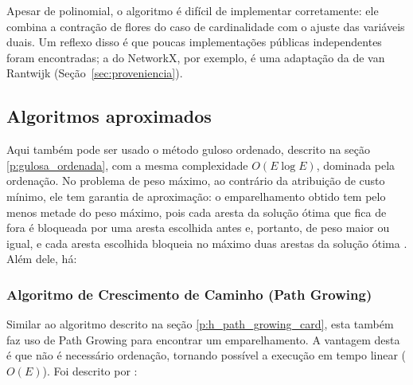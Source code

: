 Apesar de polinomial, o algoritmo é difícil de implementar corretamente: ele combina a contração de flores do caso de cardinalidade com o ajuste das variáveis duais. Um reflexo disso é que poucas implementações públicas independentes foram encontradas; a do NetworkX, por exemplo, é uma adaptação da de van Rantwijk (Seção~\ref{sec:proveniencia}).



\subsection{Algoritmos aproximados}
\label{sec:emp_pond_max_aprox}

Aqui também pode ser usado o método guloso ordenado, descrito na seção \ref{p:gulosa_ordenada}, com a mesma complexidade $O(E \log E)$, dominada pela ordenação. No problema de peso máximo, ao contrário da atribuição de custo mínimo, ele tem garantia de aproximação: o emparelhamento obtido tem pelo menos metade do peso máximo, pois cada aresta da solução ótima que fica de fora é bloqueada por uma aresta escolhida antes e, portanto, de peso maior ou igual, e cada aresta escolhida bloqueia no máximo duas arestas da solução ótima \cite{drake}. Além dele, há:

\subsubsection{Algoritmo de Crescimento de Caminho (Path Growing)}

Similar ao algoritmo descrito na seção \ref{p:h_path_growing_card}, esta também faz uso de Path Growing para encontrar um emparelhamento. A vantagem desta é que não é necessário ordenação, tornando possível a execução em tempo linear ($O(E)$). Foi descrito por :

